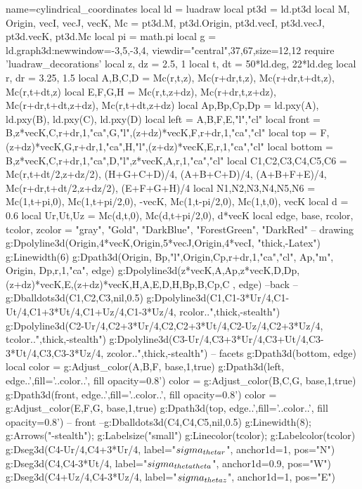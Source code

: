 \documentclass[border=5pt]{standalone}%
\begin{document}
\begin{luadraw}{name=cylindrical_coordinates}
local ld = luadraw
local pt3d = ld.pt3d
local M, Origin, vecI, vecJ, vecK, Mc = pt3d.M, pt3d.Origin, pt3d.vecI, pt3d.vecJ, pt3d.vecK, pt3d.Mc
local pi = math.pi
local g = ld.graph3d:new{window={-3,5,-3,4}, viewdir={"central",37,67},size={12,12}}
require 'luadraw_decorations'
local z, dz = 2.5, 1
local t, dt = 50*ld.deg, 22*ld.deg
local r, dr = 3.25, 1.5
local A,B,C,D = Mc(r,t,z), Mc(r+dr,t,z), Mc(r+dr,t+dt,z), Mc(r,t+dt,z)
local E,F,G,H = Mc(r,t,z+dz), Mc(r+dr,t,z+dz), Mc(r+dr,t+dt,z+dz), Mc(r,t+dt,z+dz)
local Ap,Bp,Cp,Dp = ld.pxy(A), ld.pxy(B), ld.pxy(C), ld.pxy(D)
local left = {A,B,F,E,"l","cl"}
local front = {B,z*vecK,C,r+dr,1,"ca",G,"l",(z+dz)*vecK,F,r+dr,1,"ca","cl"}
local top = {F,(z+dz)*vecK,G,r+dr,1,"ca",H,"l",(z+dz)*vecK,E,r,1,"ca","cl"}
local bottom = {B,z*vecK,C,r+dr,1,"ca",D,"l",z*vecK,A,r,1,"ca","cl"}
local C1,C2,C3,C4,C5,C6 = Mc(r,t+dt/2,z+dz/2), (H+G+C+D)/4, (A+B+C+D)/4, (A+B+F+E)/4, Mc(r+dr,t+dt/2,z+dz/2), (E+F+G+H)/4
local N1,N2,N3,N4,N5,N6 = Mc(1,t+pi,0), Mc(1,t+pi/2,0), -vecK, Mc(1,t-pi/2,0), Mc(1,t,0), vecK
local d = 0.6
local Ur,Ut,Uz = Mc(d,t,0), Mc(d,t+pi/2,0), d*vecK
local edge, base, rcolor, tcolor, zcolor = "gray", "Gold", "DarkBlue", "ForestGreen", "DarkRed"
-- drawing
g:Dpolyline3d({{Origin,4*vecK},{Origin,5*vecJ},{Origin,4*vecI}}, "thick,-Latex")
g:Linewidth(6)
g:Dpath3d({Origin, Bp,"l",Origin,Cp,r+dr,1,"ca","cl", Ap,"m", Origin, Dp,r,1,"ca"}, edge)
g:Dpolyline3d({{z*vecK,A,Ap},{z*vecK,D,Dp},{(z+dz)*vecK,E},{(z+dz)*vecK,H},{A,E},{D,H},{Bp,B},{Cp,C}
}, edge)
--back
--g:Dballdots3d({C1,C2,C3},nil,0.5)
g:Dpolyline3d({{C1,C1-3*Ur/4},{C1-Ut/4,C1+3*Ut/4},{C1+Uz/4,C1-3*Uz/4}}, rcolor..",thick,-stealth")
g:Dpolyline3d({{C2-Ur/4,C2+3*Ur/4},{C2,C2+3*Ut/4},{C2-Uz/4,C2+3*Uz/4}}, tcolor..",thick,-stealth") 
g:Dpolyline3d({{C3-Ur/4,C3+3*Ur/4},{C3+Ut/4,C3-3*Ut/4},{C3,C3-3*Uz/4}}, zcolor..",thick,-stealth")
-- facets
g:Dpath3d(bottom, edge)
local color = g:Adjust_color({A,B,F}, base,1,true)
g:Dpath3d(left, edge..',fill='..color..', fill opacity=0.8')
color = g:Adjust_color({B,C,G}, base,1,true)
g:Dpath3d(front, edge..',fill='..color..', fill opacity=0.8')
color = g:Adjust_color({E,F,G}, base,1,true)
g:Dpath3d(top, edge..',fill='..color..', fill opacity=0.8')
-- front
--g:Dballdots3d({C4,C4,C5},nil,0.5)
g:Linewidth(8); g:Arrows("-stealth"); g:Labelsize("small")
g:Linecolor(tcolor); g:Labelcolor(tcolor)
g:Dseg3d({C4-Ur/4,C4+3*Ur/4}, {label="$\\sigma_{\\theta r}$", anchor1d=1, pos="N"})
g:Dseg3d({C4,C4-3*Ut/4}, {label="$\\sigma_{\\theta \\theta}$", anchor1d=0.9, pos="W"})
g:Dseg3d({C4+Uz/4,C4-3*Uz/4}, {label="$\\sigma_{\\theta z}$", anchor1d=1, pos="E"})


\end{luadraw}
\end{document}
